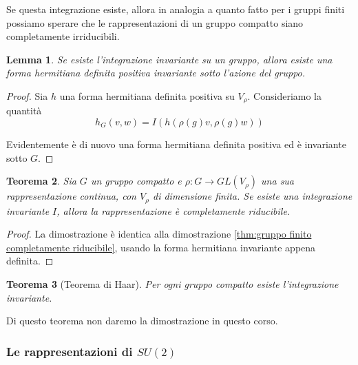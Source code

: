 \documentclass[11pt]{article}
\theoremstyle{plain}
\newtheorem{thm}{Teorema}[section]
\newtheorem{lemma}[thm]{Lemma}
\theoremstyle{definition}
\theoremstyle{remark}
\begin{document}
Se questa integrazione esiste, allora in analogia a quanto fatto per i gruppi finiti possiamo sperare che le rappresentazioni di un gruppo compatto siano completamente irriducibili.


\begin{lemma}
  Se esiste l'integrazione invariante su un gruppo, allora esiste una forma hermitiana definita positiva invariante sotto l'azione del gruppo.
\end{lemma}
\begin{proof}
  Sia $h$ una forma hermitiana definita positiva su $V_\rho$. Consideriamo la quantità
  \[ h_G(v,w) = I( h(\rho(g) v, \rho(g) w)) \]

  Evidentemente è di nuovo una forma hermitiana definita positiva ed è invariante sotto $G$.


\end{proof}




\begin{thm} Sia $G$ un gruppo compatto e $\rho : G \to GL(V_\rho)$ una sua rappresentazione continua, con $V_\rho$ di dimensione finita. Se esiste una integrazione invariante $I$, allora la rappresentazione è completamente riducibile.

\end{thm}

\begin{proof}
  La dimostrazione è identica alla dimostrazione \ref{thm:gruppo finito completamente riducibile}, usando la forma hermitiana invariante appena definita. 
\end{proof}


\begin{thm}[Teorema di Haar]
Per ogni gruppo compatto esiste l'integrazione invariante. 
\end{thm}

Di questo teorema non daremo la dimostrazione in questo corso. 
















\newpage
\subsubsection{Le rappresentazioni di $SU(2)$}
\end{document}
